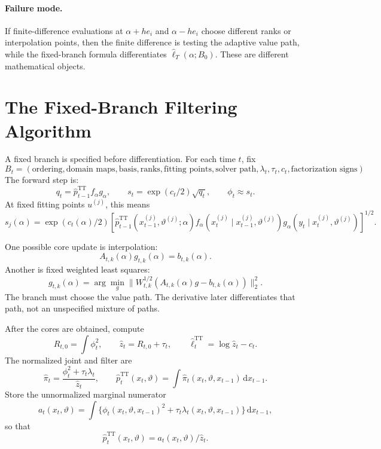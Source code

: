 \documentclass[11pt]{article}
\newcommand{\dd}{\mathrm{d}}
\newcommand{\TT}{\mathrm{TT}}
\renewcommand{\[}{\begin{equation}}
\renewcommand{\]}{\end{equation}}
\theoremstyle{definition}
\theoremstyle{remark}
\begin{document}
\paragraph{Failure mode.}
If finite-difference evaluations at \(\alpha+h e_i\) and \(\alpha-h e_i\)
choose different ranks or interpolation points, then the finite difference is
testing the adaptive value path, while the fixed-branch formula differentiates
\(\widehat\ell_T(\alpha;B_0)\).  These are different mathematical objects.

\section{The Fixed-Branch Filtering Algorithm}

A fixed branch is specified before differentiation.  For each time \(t\), fix
\[
  B_t=
  (\text{ordering},\text{domain maps},\text{basis},\text{ranks},
  \text{fitting points},\text{solver path},\lambda_t,\tau_t,c_t,
  \text{factorization signs}).
  \label{eq:p14-fixed-branch-spec}
\]
The forward step is:
\[
  q_t=\widehat p_{t-1}^{\TT}f_\alpha g_\alpha,
  \qquad
  s_t=\exp(c_t/2)\sqrt{q_t},
  \qquad
  \phi_t\approx s_t.
  \label{eq:p14-fixed-forward-target}
\]
At fixed fitting points \(u^{(j)}\), this means
\[
  s_j(\alpha)
  =
  \exp(c_t(\alpha)/2)
  \left[
  \widehat p_{t-1}^{\TT}(x_{t-1}^{(j)},\vartheta^{(j)};\alpha)
  f_\alpha(x_t^{(j)}\mid x_{t-1}^{(j)},\vartheta^{(j)})
  g_\alpha(y_t\mid x_t^{(j)},\vartheta^{(j)})
  \right]^{1/2}.
  \label{eq:p14-target-values}
\]

One possible core update is interpolation:
\[
  A_{t,k}(\alpha)g_{t,k}(\alpha)=b_{t,k}(\alpha).
  \label{eq:p14-interpolation-system}
\]
Another is fixed weighted least squares:
\[
  g_{t,k}(\alpha)
  =
  \arg\min_g
  \|W_{t,k}^{1/2}(A_{t,k}(\alpha)g-b_{t,k}(\alpha))\|_2^2.
  \label{eq:p14-ls-system}
\]
The branch must choose the value path.  The derivative later differentiates
that path, not an unspecified mixture of paths.

After the cores are obtained, compute
\[
  R_{t,0}=\int\phi_t^2,\qquad
  \widehat z_t=R_{t,0}+\tau_t,\qquad
  \widehat\ell_t^{\TT}=\log\widehat z_t-c_t.
  \label{eq:p14-fixed-forward-scalar}
\]
The normalized joint and filter are
\[
  \widehat\pi_t
  =
  \frac{\phi_t^2+\tau_t\lambda_t}{\widehat z_t},
  \qquad
  \widehat p_t^{\TT}(x_t,\vartheta)
  =
  \int\widehat\pi_t(x_t,\vartheta,x_{t-1})\,\dd x_{t-1}.
  \label{eq:p14-fixed-filter}
\]
Store the unnormalized marginal numerator
\[
  a_t(x_t,\vartheta)
  =
  \int
  \{\phi_t(x_t,\vartheta,x_{t-1})^2
  +\tau_t\lambda_t(x_t,\vartheta,x_{t-1})\}
  \,\dd x_{t-1},
  \label{eq:p14-marginal-numerator}
\]
so that
\[
  \widehat p_t^{\TT}(x_t,\vartheta)=a_t(x_t,\vartheta)/\widehat z_t.
  \label{eq:p14-filter-numerator-ratio}
\]
\end{document}
